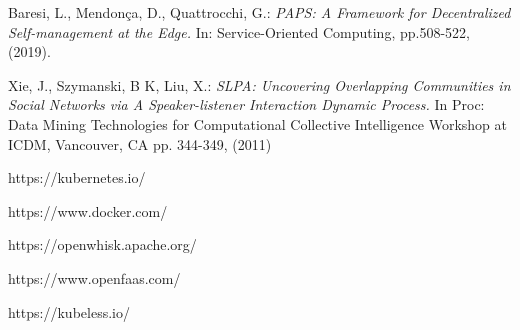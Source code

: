 \begin{thebibliography}{9}
        Baresi, L., Mendonça, D., Quattrocchi, G.: 
        \textit{PAPS: A Framework for Decentralized Self-management at the Edge.}
        In: Service-Oriented Computing, pp.508-522, (2019).   

        Xie, J., Szymanski, B K, Liu, X.:
        \textit{SLPA: Uncovering Overlapping Communities in Social Networks via
        A Speaker-listener Interaction Dynamic Process.}
        In Proc: Data Mining Technologies for Computational Collective 
        Intelligence Workshop at ICDM, Vancouver, CA pp. 344-349, (2011)

        https://kubernetes.io/

        https://www.docker.com/

        https://openwhisk.apache.org/

        https://www.openfaas.com/

        https://kubeless.io/

\end{thebibliography}